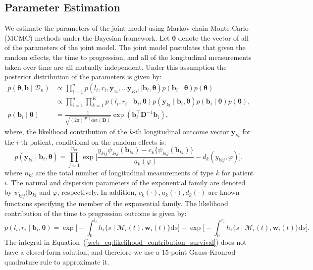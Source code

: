 \subsection{Parameter Estimation}
We estimate the parameters of the joint model using Markov chain Monte Carlo (MCMC) methods under the Bayesian framework. Let $\boldsymbol{\theta}$ denote the vector of all of the parameters of the joint model. The joint model postulates that given the random effects, the time to progression, and all of the longitudinal measurements taken over time are all mutually independent. Under this assumption the posterior distribution of the parameters is given by:
\begin{align*}
p(\boldsymbol{\theta}, \boldsymbol{b} \mid \mathcal{D}_n) & \propto \prod_{i=1}^n p(l_i, r_i, \boldsymbol{y}_{1i},\ldots \boldsymbol{y}_{Ki}, \mid \boldsymbol{b}_i, \boldsymbol{\theta}) p(\boldsymbol{b}_i \mid \boldsymbol{\theta}) p(\boldsymbol{\theta})\\
& \propto \prod_{i=1}^n \prod_{k=1}^K p(l_i, r_i \mid \boldsymbol{b}_i, \boldsymbol{\theta})  p(\boldsymbol{y}_{ki} \mid \boldsymbol{b}_{i}, \boldsymbol{\theta}) p(\boldsymbol{b}_i \mid \boldsymbol{\theta}) p(\boldsymbol{\theta}),\\
p(\boldsymbol{b}_i \mid \boldsymbol{\theta}) &= \frac{1}{\sqrt{(2 \pi)^{\mid W \mid} \text{det}(\boldsymbol{D})}} \exp(\boldsymbol{b}_i^{\top} \boldsymbol{D}^{-1} \boldsymbol{b}_i),
\end{align*}
where, the likelihood contribution of the ${k\mbox{-th}}$ longitudinal outcome vector $\boldsymbol{y}_{ki}$ for the ${i\mbox{-th}}$ patient, conditional on the random effects is:
\begin{equation*}
p(\boldsymbol{y}_{ki} \mid \boldsymbol{b}_i, \boldsymbol{\theta}) = \prod_{j=1}^{n_{ki}} \exp\Bigg[\frac{y_{kij} \psi_{kij}(\boldsymbol{b}_{ki}) - c_k\big\{\psi_{kij}(\boldsymbol{b}_{ki})\big\}}{a_k(\varphi)} - d_k(y_{kij}, \varphi)\Bigg],
\end{equation*}
where $n_{ki}$ are the total number of longitudinal measurements of type $k$ for patient $i$. The natural and dispersion parameters of the exponential family are denoted by $\psi_{kij}(\boldsymbol{b}_{ki}$ and $\varphi$, respectively. In addition, $c_k(\cdot), a_k(\cdot), d_k(\cdot)$ are known functions specifying the member of the exponential family. The likelihood contribution of the time to progression outcome is given by:
\begin{equation}
\label{web_eq:likelihood_contribution_survival}
p(l_i,r_i\mid \boldsymbol{b}_i,\boldsymbol{\theta}) = \exp\Big[-\int_0^{l_i} h_i\big\{s \mid \mathcal{M}_i(t), \boldsymbol{w}_i(t)\big\}\mathrm{d}{s}\Big] - \exp\Big[-\int_0^{r_i}h_i\big\{s \mid \mathcal{M}_i(t), \boldsymbol{w}_i(t)\big\}\mathrm{d}{s}\Big].
\end{equation}
The integral in Equation~(\ref{web_eq:likelihood_contribution_survival}) does not have a closed-form solution, and therefore we use a 15-point Gauss-Kronrod quadrature rule to approximate it.

